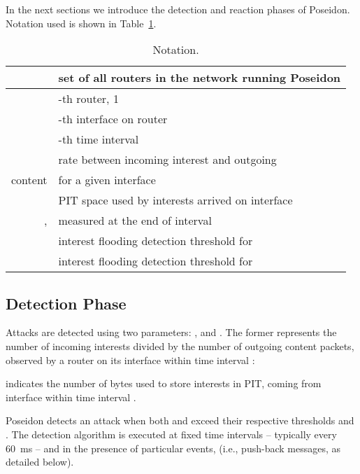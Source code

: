 \documentclass[10pt,conference,letterpaper]{IEEEtran}
\begin{document}
In the next sections we introduce the detection and reaction phases of Poseidon. 
Notation used is shown in Table~\ref{tab:notation}.

\begin{table}[h]
\begin{center} 
\resizebox{0.44\textwidth}{!} {
\begin{tabular}{|r|l|}
\hline
 &  set of all routers in the network running Poseidon
\\ \hline
 &  -th router, 1     
\\ \hline
&	 -th interface on router  
\\ \hline
   &	 -th time interval 
\\ \hline
 & rate between incoming interest and outgoing \\content
			& for a given interface 
\\ \hline
   & PIT space used by interests arrived on interface\\ , 
				    & measured at the end of interval 
\\ \hline
   & interest flooding detection threshold for 
\\ \hline
  & interest flooding detection threshold for 
\\ \hline
\end{tabular}
}
\end{center}
\caption{Notation.}
\label{tab:notation}

\end{table}






\subsection{Detection Phase}
\label{detectionphase}



Attacks are detected using two parameters: , and . 
The former represents the number of incoming interests divided by the number of outgoing 
content packets, observed by a router  on its interface  within time interval 
:

 indicates the number of bytes used to store interests in PIT, coming from interface  within time interval .


Poseidon detects an attack when both  and  exceed their respective thresholds  and .
The detection algorithm is executed at fixed time intervals -- typically every 60~ms -- and in the presence of particular events, (i.e., push-back messages, as detailed below).
\end{document}
